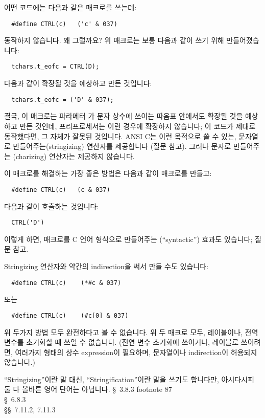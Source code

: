 \begin{faq}
	어떤 코드에는 다음과 같은 매크로를 쓰는데:
\begin{verbatim}
  #define CTRL(c)   ('c' & 037)
\end{verbatim}
	\noindent 동작하지 않습니다. 왜 그럴까요?
\A
	위 매크로는 보통 다음과 같이 쓰기 위해 만들어졌습니다:
\begin{verbatim}
  tchars.t_eofc = CTRL(D);
\end{verbatim}
	\noindent 다음과 같이 확장될 것을 예상하고 만든 것입니다:
\begin{verbatim}
  tchars.t_eofc = ('D' & 037);
\end{verbatim}
	결국, 이 매크로는 파라메터 가 문자 상수에 쓰이는 따옴표 안에서도
        확장될 것을 예상하고 만든 것인데, 프리프로세서는 이런 경우에
        확장하지 않습니다; 이 코드가 제대로 동작했다면, 그 자체가 잘못된
        것입니다. ANSI C는 이런 목적으로 쓸 수 있는, 문자열로 
        만들어주는(stringizing) 연산자를 제공합니다 (질문  참고).
        그러나 문자로 만들어주는 (charizing) 연산자는 제공하지 않습니다.

        이 매크로를 해결하는 가장 좋은 방법은 다음과 같이 매크로를 만들고:
\begin{verbatim}
  #define CTRL(c)   (c & 037)
\end{verbatim}
	\noindent 다음과 같이 호출하는 것입니다:
\begin{verbatim}
  CTRL('D')
\end{verbatim}
	\noindent 이렇게 하면, 매크로를 C 언어 형식으로 만들어주는
        (``syntactic'') 효과도 있습니다; 질문  참고.

        Stringizing 연산자와 약간의 indirection을 써서 만들 수도 있습니다:
\begin{verbatim}
  #define CTRL(c)    (*#c & 037)
\end{verbatim}
	\noindent 또는
\begin{verbatim}
  #define CTRL(c)    (#c[0] & 037)
\end{verbatim}
	\noindent 위 두가지 방법 모두 완전하다고 볼 수 없습니다. 위 두 매크로
        모두,
         레이블이나, 전역 변수를 초기화할 때 쓰일 수 없습니다.
        (전연 변수 초기화에 쓰이거나,  레이블로 쓰이려면, 여러가지
        형태의 상수 expression이 필요하며, 문자열이나 indirection이
        허용되지 않습니다.)


\T
	``Stringizing''이란 말 대신, ``Stringification''이란 말을 쓰기도
	합니다만, 아시다시피 둘 다 올바른 영어 단어는 아닙니다.
\R
	\cite{ansi} \S\ 3.8.3 footnote 87 \\
        \cite{c89} \S\ 6.8.3 \\
        \cite{hs} \S\S\ 7.11.2, 7.11.3 
\end{faq}


